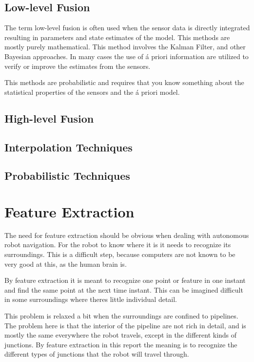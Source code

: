 \subsection{Low-level Fusion}
The term low-level fusion is often used when the sensor data is directly integrated
resulting in parameters and state estimates of the model. This methods are mostly purely
mathematical. This method involves the Kalman Filter, and other Bayesian approaches. In
many cases the use of \'a priori information are utilized to verify or improve the
estimates from the sensors.

This methods are probabilistic and requires that you know something about the
statistical properties of the sensors and the \'a priori model. 


\subsection{High-level Fusion}



\subsection{Interpolation Techniques}



\subsection{Probabilistic Techniques}



\section{Feature Extraction}
The need for feature extraction should be obvious when dealing with autonomous robot
navigation. For the robot to know where it is it needs to recognize its surroundings. This
is a difficult step, because computers are not known to be very good at this, as the human
brain is. 

By feature extraction it is meant to recognize one point or feature in one instant and
find the same point at the next time instant. This can be imagined difficult in some
surroundings where theres little individual detail. 

This problem is relaxed a bit when the surroundings are confined to pipelines. The problem
here is that the interior of the pipeline are not rich in detail, and is mostly the same
everywhere the robot travels, except in the different kinds of junctions. By feature
extraction in this report the meaning is to recognize the different types of junctions
that the robot will travel through. 



